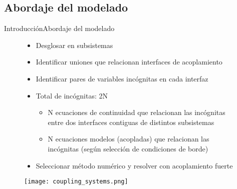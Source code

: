 \subsection{Abordaje del modelado}
\begin{frame}{Introducción}{Abordaje del modelado}

  \begin{figure}[ht]
    \begin{minipage}{0.58\linewidth}
      \begin{itemize}
      \item <2-> Desglosar en subsistemas
      \item <3-> Identificar uniones que relacionan interfaces de acoplamiento
      \item <4-> Identificar pares de variables incógnitas en cada interfaz
      \item <5-> Total de incógnitas: 2N
        \begin{itemize}
        \item <6-> N ecuaciones de continuidad que relacionan las incógnitas entre dos interfaces contiguas de distintos subsistemas
        \item <7-> N ecuaciones modelos (acopladas) que relacionan las incógnitas (según selección de condiciones de borde)
        \end{itemize} 
      \item <8-> Seleccionar método numérico y resolver con acoplamiento fuerte
      \end{itemize}    
    \end{minipage}
    \begin{minipage}{0.4\linewidth}
      \centering
      \texttt{[image: coupling\_systems.png]}
      \label{esquma-DDM}
    \end{minipage}
    \label{aasdasd}
  \end{figure}
  
  
\end{frame}



